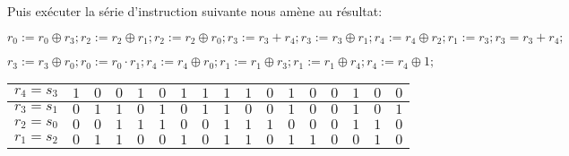 \documentclass{article}
\begin{document}
Puis exécuter la série d'instruction suivante nous amène au résultat: 

$r_{0}:=r_{0}\oplus r_{3};r_{2}:=r_{2}\oplus r_{1};r_{2}:=r_{2}\oplus r_{0};r_{3}:=r_{3}+r_{4};r_{3}:=r_{3}\oplus r_{1};r_{4}:=r_{4}\oplus r_{2}; r_{1}:=r_{3}; r_{3}=r_{3}+r_{4};$

$ r_{3}:=r_{3}\oplus r_{0}; r_{0}:=r_{0}\cdot r_{1}; r_{4}:=r_{4}\oplus r_{0}; r_{1}:=r_{1}\oplus r_{3}; r_{1}:=r_{1}\oplus r_{4}; r_{4}:=r_{4}\oplus 1 ;
$
\medbreak
\begin{center}
\begin{tabular}{|l|l|l|l|l|l|l|l|l|l|l|l|l|l|l|l|l|}
\hline
\multicolumn{1}{|l|}{$r_{4}=s_{3}$}&	\multicolumn{1}{|l|}{ $1$}&	\multicolumn{1}{|l|}{ $0$}&	\multicolumn{1}{|l|}{ $0$}&	\multicolumn{1}{|l|}{ $1$}&	\multicolumn{1}{|l|}{ $0$}&	\multicolumn{1}{|l|}{ $1$}&	\multicolumn{1}{|l|}{ $1$}&	\multicolumn{1}{|l|}{ $1$}&	\multicolumn{1}{|l|}{ $1$}&	\multicolumn{1}{|l|}{ $0$}&	\multicolumn{1}{|l|}{ $1$}&	\multicolumn{1}{|l|}{ $0$}&	\multicolumn{1}{|l|}{ $0$}&	\multicolumn{1}{|l|}{ $1$}&	\multicolumn{1}{|l|}{ $0$}&	\multicolumn{1}{|l|}{ $0$}	\\
\hline
\multicolumn{1}{|l|}{ $r_{3}=s_{1}$}&	\multicolumn{1}{|l|}{ $0$}&	\multicolumn{1}{|l|}{ $1$}&	\multicolumn{1}{|l|}{ $1$}&	\multicolumn{1}{|l|}{ $0$}&	\multicolumn{1}{|l|}{ $1$}&	\multicolumn{1}{|l|}{ $0$}&	\multicolumn{1}{|l|}{ $1$}&	\multicolumn{1}{|l|}{ $1$}&	\multicolumn{1}{|l|}{ $0$}&	\multicolumn{1}{|l|}{ $0$}&	\multicolumn{1}{|l|}{ $1$}&	\multicolumn{1}{|l|}{ $0$}&	\multicolumn{1}{|l|}{ $0$}&	\multicolumn{1}{|l|}{ $1$}&	\multicolumn{1}{|l|}{ $0$}&	\multicolumn{1}{|l|}{ $1$}	\\
\hline
\multicolumn{1}{|l|}{ $r_{2}=s_{0}$}&	\multicolumn{1}{|l|}{ $0$}&	\multicolumn{1}{|l|}{ $0$}&	\multicolumn{1}{|l|}{ $1$}&	\multicolumn{1}{|l|}{ $1$}&	\multicolumn{1}{|l|}{ $1$}&	\multicolumn{1}{|l|}{ $0$}&	\multicolumn{1}{|l|}{ $0$}&	\multicolumn{1}{|l|}{ $1$}&	\multicolumn{1}{|l|}{ $1$}&	\multicolumn{1}{|l|}{ $1$}&	\multicolumn{1}{|l|}{ $0$}&	\multicolumn{1}{|l|}{ $0$}&	\multicolumn{1}{|l|}{ $0$}&	\multicolumn{1}{|l|}{ $1$}&	\multicolumn{1}{|l|}{ $1$}&	\multicolumn{1}{|l|}{ $0$}	\\
\hline
\multicolumn{1}{|l|}{ $r_{1}=s_{2}$}&	\multicolumn{1}{|l|}{ $0$}&	\multicolumn{1}{|l|}{ $1$}&	\multicolumn{1}{|l|}{ $1$}&	\multicolumn{1}{|l|}{ $0$}&	\multicolumn{1}{|l|}{ $0$}&	\multicolumn{1}{|l|}{ $1$}&	\multicolumn{1}{|l|}{ $0$}&	\multicolumn{1}{|l|}{ $1$}&	\multicolumn{1}{|l|}{ $1$}&	\multicolumn{1}{|l|}{ $0$}&	\multicolumn{1}{|l|}{ $1$}&	\multicolumn{1}{|l|}{ $1$}&	\multicolumn{1}{|l|}{ $0$}&	\multicolumn{1}{|l|}{ $0$}&	\multicolumn{1}{|l|}{ $1$}&	\multicolumn{1}{|l|}{ $0$}	\\

\end{tabular}
\end{center}
\end{document}
